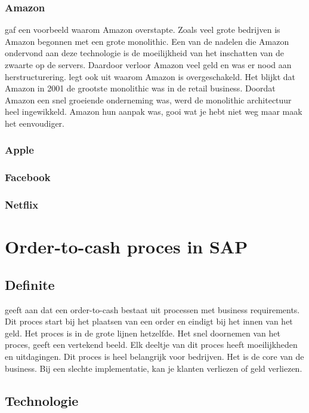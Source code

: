 \subsubsection{Amazon}
\textcite{Mauersberger2017} gaf een voorbeeld waarom Amazon overstapte. Zoals veel grote bedrijven is Amazon begonnen met een grote monolithic. Een van de nadelen die Amazon ondervond aan deze technologie is de moeilijkheid van het inschatten van de zwaarte op de servers. Daardoor verloor Amazon veel geld en was er nood aan herstructurering.
\textcite{Fulton2015} legt ook uit waarom Amazon is overgeschakeld. Het blijkt dat Amazon in 2001 de grootste monolithic was in de retail business. Doordat Amazon een snel groeiende onderneming was, werd de monolithic architectuur heel ingewikkeld. Amazon hun aanpak was, gooi wat je hebt niet weg maar maak het eenvoudiger. 
\subsubsection{Apple}
\subsubsection{Facebook}
\subsubsection{Netflix}

\section{Order-to-cash proces in SAP}
\subsection{Definite}
\textcite{Obrien2017} geeft aan dat een order-to-cash bestaat uit processen met business requirements. Dit proces start bij het plaatsen van een order en eindigt bij het innen van het geld. Het proces is in de grote lijnen hetzelfde. Het snel doornemen van het proces, geeft een vertekend beeld. Elk deeltje van dit proces heeft moeilijkheden en uitdagingen. 
Dit proces is heel belangrijk voor bedrijven. Het is de core van de business. Bij een slechte implementatie, kan je klanten verliezen of geld verliezen. 
\subsection{Technologie}
